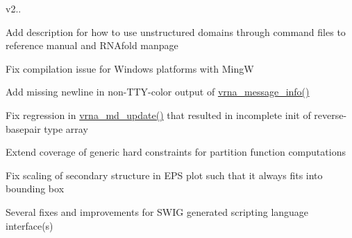 v2..
\begin{DoxyItemize}
\item Add description for how to use unstructured domains through command files to reference manual and R\+N\+Afold manpage
\item Fix compilation issue for Windows platforms with MingW
\item Add missing newline in non-\/\+T\+T\+Y-\/color output of \hyperlink{group__utils_ga039bae6153a6415b054dbe6045f83d03}{vrna\+\_\+message\+\_\+info()}
\item Fix regression in \hyperlink{group__model__details_ga36ae40b8c3b82362f5798ad5b047b814}{vrna\+\_\+md\+\_\+update()} that resulted in incomplete init of reverse-\/basepair type array
\item Extend coverage of generic hard constraints for partition function computations
\item Fix scaling of secondary structure in E\+PS plot such that it always fits into bounding box
\item Several fixes and improvements for S\+W\+IG generated scripting language interface(s)
\end{DoxyItemize}

